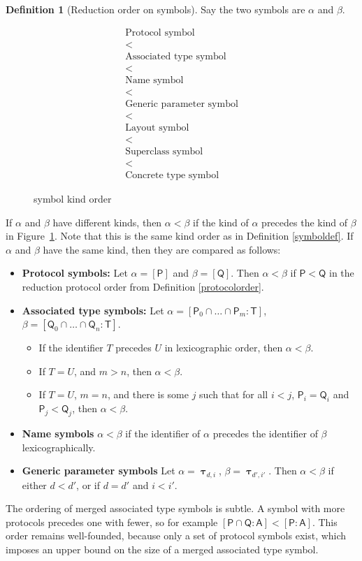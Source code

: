 \documentclass[headsepline,bibliography=totoc]{scrreport}
\newcommand{\namesym}[1]{\mathsf{#1}}
\newcommand{\proto}[1]{\bm{\mathsf{#1}}}
\newcommand{\protosym}[1]{[\proto{#1}]}
\newcommand{\genericsym}[2]{\bm{\uptau}_{#1,#2}}
\newcommand{\assocsym}[2]{[\proto{#1}\colon\namesym{#2}]}
\theoremstyle{definition}
\theoremstyle{definition}
\newtheorem{definition}{Definition}[chapter]
\theoremstyle{definition}
\begin{document}
\begin{definition}[Reduction order on symbols]\label{symbolorder}
Say the two symbols are $\alpha$ and $\beta$.
\begin{figure}\caption{symbol kind order}\label{kindorder}
\[
\begin{array}{c}
\text{Protocol symbol}\\
<\\
\text{Associated type symbol}\\
<\\
\text{Name symbol}\\
<\\
\text{Generic parameter symbol}\\
<\\
\text{Layout symbol}\\
<\\
\text{Superclass symbol}\\
<\\
\text{Concrete type symbol}
\end{array}
\]
\end{figure}

If $\alpha$ and $\beta$ have different kinds, then $\alpha<\beta$ if the kind of $\alpha$ precedes the kind of $\beta$ in Figure~\ref{kindorder}. Note that this is the same kind order as in Definition \ref{symboldef}.
If $\alpha$ and $\beta$ have the same kind, then they are compared as follows:

\begin{itemize}
\item \textbf{Protocol symbols:} Let $\alpha=\protosym{P}$ and $\beta=\protosym{Q}$. Then $\alpha<\beta$ if $\proto{P}<\proto{Q}$ in the reduction protocol order from Definition \ref{protocolorder}.
\item \textbf{Associated type symbols:} Let
$
\alpha=[\proto{P}_0\cap\ldots\cap\proto{P}_m:\namesym{T}]$, $
\beta=[\proto{Q}_0\cap\ldots\cap\proto{Q}_n:\namesym{T}]$.
\begin{itemize}
\item If the identifier $T$ precedes $U$ in lexicographic order, then $\alpha < \beta$.
\item If $T=U$, and $m>n$, then $\alpha < \beta$.
\item If $T=U$, $m=n$, and there is some $j$ such that for all $i<j$, $\proto{P}_i=\proto{Q}_i$ and $\proto{P}_j<\proto{Q}_j$, then $\alpha<\beta$.
\end{itemize}
\item \textbf{Name symbols} $\alpha<\beta$ if the identifier of $\alpha$ precedes the identifier of $\beta$ lexicographically.
\item \textbf{Generic parameter symbols} Let $\alpha=\genericsym{d}{i}$, $\beta=\genericsym{d'}{i'}$. Then $\alpha < \beta$ if either $d<d'$, or if $d=d'$ and $i<i'$.
\end{itemize}
\end{definition}
The ordering of merged associated type symbols is subtle. A symbol with more protocols precedes one with fewer, so for example
$[\proto{P}\cap\proto{Q}:\namesym{A}]<\assocsym{P}{A}$. This order remains well-founded, because only a set of protocol symbols exist, which imposes an upper bound on the size of a merged associated type symbol.
\end{document}
